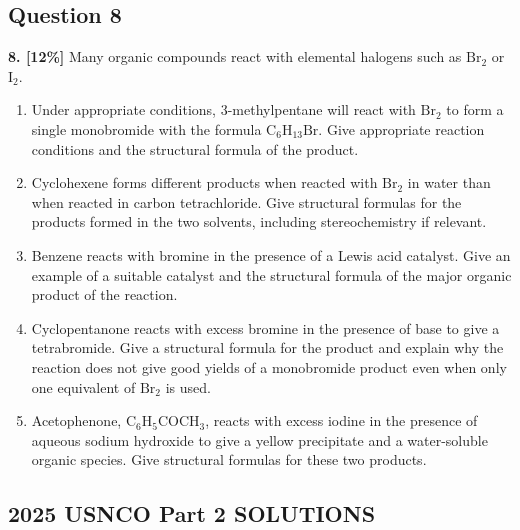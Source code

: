 \documentclass[10pt,a4paper]{article}
\begin{document}
\subsection*{Question 8}
\textbf{8. [12\%]} Many organic compounds react with elemental halogens such as $\text{Br}_2$ or $\text{I}_2$.
\begin{enumerate}[label=\alph*.]
    \vspace{5cm} \item Under appropriate conditions, 3-methylpentane will react with $\text{Br}_2$ to form a single monobromide with the formula $\text{C}_6\text{H}_{13}\text{Br}$. Give appropriate reaction conditions and the structural formula of the product.
    \vspace{5cm} \item Cyclohexene forms different products when reacted with $\text{Br}_2$ in water than when reacted in carbon tetrachloride. Give structural formulas for the products formed in the two solvents, including stereochemistry if relevant.
    \vspace{5cm} \item Benzene reacts with bromine in the presence of a Lewis acid catalyst. Give an example of a suitable catalyst and the structural formula of the major organic product of the reaction.
    \vspace{5cm} \item Cyclopentanone reacts with excess bromine in the presence of base to give a tetrabromide. Give a structural formula for the product and explain why the reaction does not give good yields of a monobromide product even when only one equivalent of $\text{Br}_2$ is used.
    \vspace{5cm} \item Acetophenone, $\text{C}_6\text{H}_5\text{COCH}_3$, reacts with excess iodine in the presence of aqueous sodium hydroxide to give a yellow precipitate and a water-soluble organic species. Give structural formulas for these two products.
\end{enumerate}

\newpage
\subsection*{2025 USNCO Part 2 SOLUTIONS}
\end{document}
